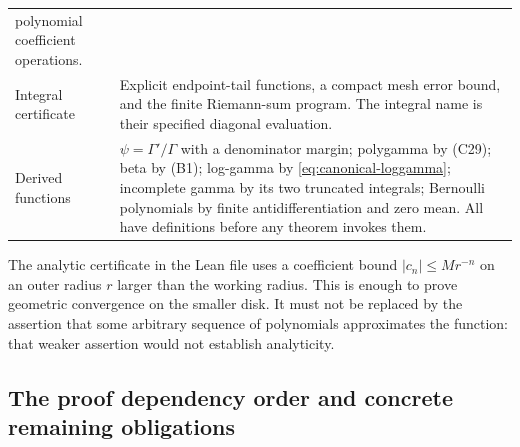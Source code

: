 \begin{longtable}{@{}>{\raggedright\arraybackslash}p{}>{\raggedright\arraybackslash}p{}@{}}
polynomial coefficient operations.\\
Integral certificate & Explicit endpoint-tail functions, a compact mesh
error bound, and the finite Riemann-sum program. The integral name is
their specified diagonal evaluation.\\
Derived functions & $\psi=\Gamma'/\Gamma$ with a denominator margin;
polygamma by (C29); beta by (B1); log-gamma by
\eqref{eq:canonical-loggamma}; incomplete gamma by its two truncated
integrals; Bernoulli polynomials by finite antidifferentiation and zero
mean. All have definitions before any theorem invokes them.\\
\bottomrule
\end{longtable}

The analytic certificate in the Lean file uses a coefficient bound
$|c_n|\le M r^{-n}$ on an outer radius $r$ larger than the working
radius. This is enough to prove geometric convergence on the smaller
disk. It must not be replaced by the assertion that some arbitrary
sequence of polynomials approximates the function: that weaker
assertion would not establish analyticity.

\subsection{The proof dependency order and concrete remaining obligations}


